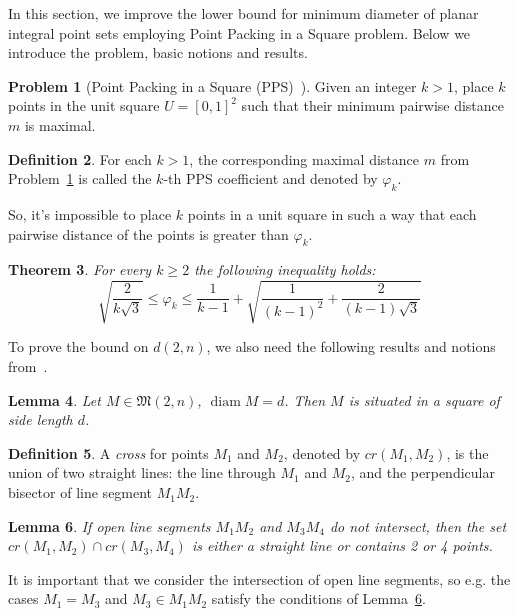 \documentclass[a4paper,14pt]{article} %
\theoremstyle{plain}
\newtheorem{theorem}{Theorem}[section]
\newtheorem{lemma}[theorem]{Lemma}
\theoremstyle{definition}
\newtheorem{definition}[theorem]{Definition}
\newtheorem{problem}[theorem]{Problem}
\begin{document}
In this section,
we improve the lower bound for minimum diameter of planar integral point sets
employing Point Packing in a Square problem.
Below we introduce the problem, basic notions and results.

\begin{problem}[Point Packing in a Square (PPS)~\cite{locatelli2002packing,costa2013valid}]
	\label{problem:PPS}
	Given an integer $k > 1$, place $k$ points in the unit square $U = [ 0 , 1 ]^2$ such that their
	minimum pairwise distance $m$ is maximal.
\end{problem}

\begin{definition}
	For each $k > 1$, the corresponding maximal distance $m$ from Problem~\ref{problem:PPS}
	is called the $k$-th PPS coefficient and denoted by $\varphi_k$.
\end{definition}
So, it's impossible to place $k$ points in a unit square in such a way that each pairwise distance of the points is greater than $\varphi_k$.


\begin{theorem}
	\label{thm:varphi_k_bounds}
	\cite{costa2013valid}
	For every $k\geq 2$ the following inequality holds:
	\begin{equation*}
		\sqrt{\frac{2}{k\sqrt{3}}}
		\leq
		\varphi_k
		\leq
		\frac{1}{k-1} +
		\sqrt{
			\frac{1}{(k-1)^2}
			+
			\frac{2}{(k-1)\sqrt{3}}
		}
	\end{equation*}
\end{theorem}


To prove the bound on $d(2,n)$, we also need the following results and notions from~\cite{our-vmmsh-2018}.

\begin{lemma}
	\cite[Lemma 4]{our-vmmsh-2018}
	\label{lem:square_container}
	Let $M\in\mathfrak{M}(2,n)$, $\operatorname{diam} M = d$.
	Then $M$ is situated in a square of side length $d$.
\end{lemma}

\begin{definition}
	A \textit{cross} for points $M_1$ and $M_2$, denoted by $cr(M_1,M_2)$, is the union of two straight lines:
	the line through $M_1$ and $M_2$,
	and the perpendicular bisector of line segment $M_1 M_2$.
\end{definition}

\begin{lemma}
	\label{lem:intervals_cross}
	If open line segments $M_1 M_2$ and $M_3 M_4$ do not intersect,
	then the set $cr(M_1,M_2) \cap cr(M_3,M_4)$ is either a straight line or contains 2 or 4 points.
\end{lemma}
It is important that we consider the intersection of open line segments,
so e.g. the cases $M_1 = M_3$ and $M_3 \in M_1 M_2$ satisfy the conditions of Lemma~\ref{lem:intervals_cross}.
\end{document}
